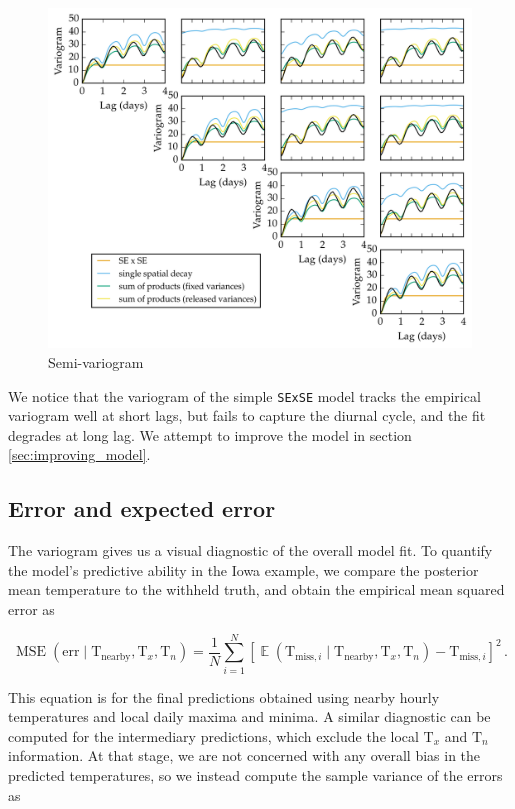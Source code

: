 \documentclass[letter]{article}
\makeatletter
\def\maxwidth{\ifdim\Gin@nat@width>\linewidth\linewidth
\else\Gin@nat@width\fi}
\let\Oldincludegraphics\includegraphics
\renewcommand{\includegraphics}[1]{\Oldincludegraphics[width=.8\maxwidth]{#1}}
\newcommand{\genericdel}[3]{%
      \left#1#3\right#2
    }
\newcommand{\del}[1]{\genericdel(){#1}}
\newcommand{\sbr}[1]{\genericdel[]{#1}}
\DeclareMathOperator{\E}{\mathbb{E}}
\DeclareMathOperator{\mse}{{MSE}}
\newcommand{\T}{\mathrm{T}}
\newcommand{\Tn}{\T_{n}}
\newcommand{\Tx}{\T_{x}}
\newcommand{\miss}{\mathrm{miss}}
\newcommand{\obs}{\mathrm{nearby}}
\newcommand{\error}{\mathrm{err}}
\makeatother
\begin{document}
\begin{figure}
\centering
\includegraphics{../figures/spatial_variogram.png}
\caption{\label{fig:spatial_variogram} Semi-variogram}
\end{figure}
    


        We notice that the variogram of the simple \texttt{SExSE} model tracks the empirical variogram well at short lags, but fails to capture the diurnal cycle, and the fit degrades at long lag. We attempt to improve the model in section \ref{sec:improving_model}.
    


        \subsection{Error and expected error}\label{error-and-expected-error}

The variogram gives us a visual diagnostic of the overall model fit. To quantify the model's predictive ability in the Iowa example, we compare the posterior mean temperature to the withheld truth, and obtain the empirical mean squared error as

\begin{equation}
    \label{eq:mse}
    \mse\del{\error \mid \T_\obs,\Tx,\Tn} = \frac{1}{N} \sum_{i=1}^N \sbr{\E\del{\T_{\miss,i} \mid \T_\obs,\Tx,\Tn} - \T_{\miss,i}}^2\,.
\end{equation}

This equation is for the final predictions obtained using nearby hourly temperatures and local daily maxima and minima.
A similar diagnostic can be computed for the intermediary predictions, which exclude the local \(\Tx\) and \(\Tn\) information.
At that stage, we are not concerned with any overall bias in the predicted temperatures, so we instead compute the sample variance of the errors as
\end{document}

